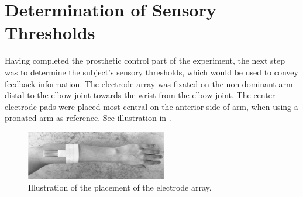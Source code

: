 
\section{Determination of Sensory Thresholds}

Having completed the prosthetic control part of the experiment, the next step was to determine the subject's sensory thresholds, which would be used to convey feedback information. The electrode array was fixated on the non-dominant arm distal to the elbow joint  towards the wrist from the elbow joint. The center electrode pads were placed most central on the anterior side of arm, when using a pronated arm as reference. See illustration in .

\begin{figure}[H]                 
	\includegraphics[width=0.55\textwidth]{figures/elec_place}  
	\caption{Illustration of the placement of the electrode array.}
	\label{fig:meth:elec_place} 
\end{figure}

